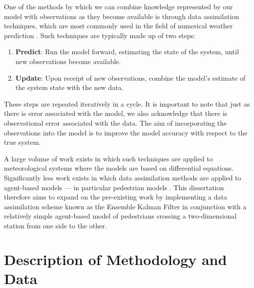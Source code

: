 \documentclass[12pt, twoside, a4paper]{article}
\begin{document}
One of the methods by which we can combine knowledge represented by our model
with observations as they become available is through data assimilation
techniques, which are most commonly used in the field of numerical weather
prediction \citep{kalnay2003atmospheric}.
Such techniques are typically made up of two steps:
\begin{enumerate}
    \item \textbf{Predict}: Run the model forward, estimating the state of the
        system, until new observations become available.
    \item \textbf{Update}: Upon receipt of new observations, combine the model's
        estimate of the system state with the new data.
\end{enumerate}
These steps are repeated iteratively in a cycle.
It is important to note that just as there is error associated with the model,
we also acknowledge that there is observational error associated with the data.
The aim of incorporating the observations into the model is to improve the model
accuracy with respect to the true system.

A large volume of work exists in which such techniques are applied to
meteorological systems where the models are based on differential equations.
Significantly less work exists in which data assimilation methods are applied to
agent-based models \citep{wang2017random} --- in particular pedestrian models
\citep{wang2013data, rai2013behavior, wang2015data, ward2016dynamic}.
This dissertation therefore aims to expand on the pre-existing work by
implementing a data assimilation scheme known as the Ensemble Kalman Filter in
conjunction with a relatively simple agent-based model of pedestrians crossing a
two-dimensional station from one side to the other.

\section{Description of Methodology and Data}\label{sec:method_descr}

\end{document}
